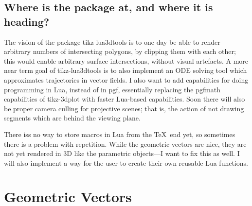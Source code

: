 \documentclass[12pt]{report}
\begin{document}
        \section{Where is the package at, and where it is heading?}
            The vision of the package tikz-lua3dtools is to one 
            day be able to render arbitrary numbers of intersecting 
            polygons, by clipping them with each other; this would 
            enable arbitrary surface intersections, without 
            visual artefacts. A more near term goal of 
            tikz-lua3dtools is to also implement an ODE 
            solving tool which approximates trajectories in 
            vector fields. I also want to add capabilities for 
            doing programming in Lua, instead of in pgf,
            essentially replacing the pgfmath capabilities of 
            tikz-3dplot with faster Lua-based capabilities.
            Soon there will also be proper camera culling for 
            projective scenes; that is, the action of not drawing 
            segments which are behind the viewing plane.\par 
            There iss no way  to store macros in Lua from the \TeX\      
            end yet, so sometimes there is a problem with 
            repetition. While the geometric vectors are nice,
            they are not yet rendered in 3D like the parametric 
            objects---I want to fix this as well.
            I will also implement a way for the user to create 
            their own reusable Lua functions.
    \chapter{Geometric Vectors}
\end{document}
